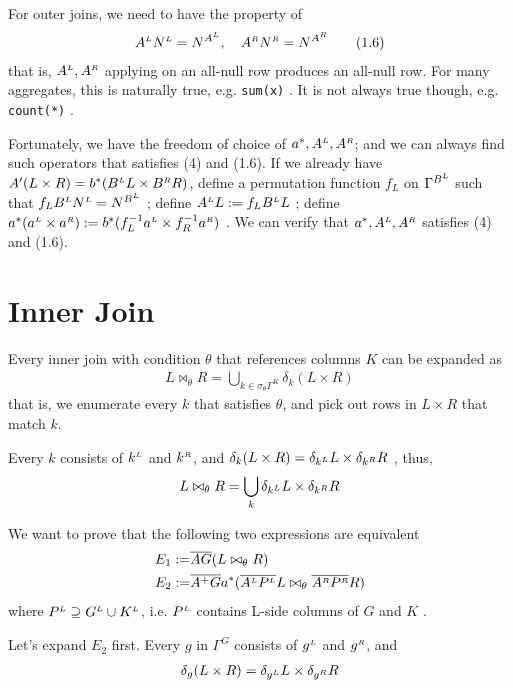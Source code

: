 \documentclass[article]{article}
\newcommand{\U}{\bigcup}
\newcommand{\ag}[1]{\overline{#1}}
\newcommand{\LL}{^\mathsmaller{\mathsmaller L}}
\newcommand{\RR}{^\mathsmaller{\mathsmaller R}}
\begin{document}
For outer joins, we need to have the property of
\begin{align} A\LL N\LL = N^{A\LL}  ,\quad A\RR N\RR = N^{A\RR}  \tag{1.6} \end{align}
that is, $A\LL, A\RR$ applying on an all-null row produces an all-null row.
For many aggregates, this is naturally true, e.g. {\tt sum(x)} .
It is not always true though, e.g. {\tt count(*)} .

Fortunately, we have the freedom of choice of $a^*, A\LL, A\RR$;
and we can always find such operators that satisfies (4) and (1.6).
If we already have $A'(L \times R) = b^*( B\LL L \times B\RR R )$, 
define a permutation function $f_L$ on $\Gamma^{B\LL}$
such that $f_L B\LL N\LL = N^{B\LL}$ ;
define $A\LL L := f_L B\LL L$ ;
define $a^*(a\LL \times a\RR) := b^*(f_L^{-1}a\LL \times f_R^{-1}a\RR)$ .
We can verify that $a^*, A\LL, A\RR$ satisfies (4) and (1.6).

\section{ Inner Join }

Every inner join with condition $\theta$ that references columns $K$ can be expanded as
\begin{align}
  L \bowtie _\theta R = \U_{k\in \sigma_\theta \Gamma^K} \delta_k (L \times R)
\end{align}
that is, we enumerate every $k$ that satisfies $\theta$, and pick out rows
in $L\times R$ that match $k$. 

Every $k$ consists of $k\LL$ and $k\RR$, and
$
  \delta_k (L \times R) =  \delta_{k\LL} L \times \delta_{k\RR} R
$ , thus, 
\begin{align}
L \bowtie _\theta R = \U_{k} \delta_{k\LL} L \times \delta_{k\RR} R
\end{align}

We want to prove that the following two expressions are equivalent
\begin{align}
E_1 :=& \ag{AG} (L \bowtie_\theta R)  \\
E_2 :=& \ag{A^+ G} a^* (\ag{A\LL P\LL} L \bowtie_\theta \ag{A\RR P\RR} R) 
\end{align}
where $P\LL \supseteq G\LL \cup K\LL $, 
i.e. $P\LL$ contains L-side columns of $G$ and $K$ .


Let's expand $E_2$ first.
Every $g$ in $\Gamma^G$ consists of $g\LL$ and $g\RR$, and
\begin{align}
  \delta_g (L \times R) =  \delta_{g\LL} L \times \delta_{g\RR} R
\end{align}
\end{document}
